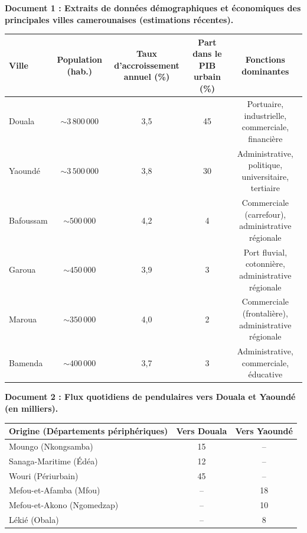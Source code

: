 \documentclass[11pt]{article}
\begin{document}
\begin{exercice}
\textbf{Document 1 : Extraits de données démographiques et économiques des principales villes camerounaises (estimations récentes).}

\begin{tabular}{lcccc}
\toprule
\textbf{Ville} & \textbf{Population (hab.)} & \textbf{Taux d'accroissement annuel (\%)} & \textbf{Part dans le PIB urbain (\%)} & \textbf{Fonctions dominantes} \\
\midrule
Douala & $\sim 3\,800\,000$ & 3,5 & 45 & Portuaire, industrielle, commerciale, financière \\
Yaoundé & $\sim 3\,500\,000$ & 3,8 & 30 & Administrative, politique, universitaire, tertiaire \\
Bafoussam & $\sim 500\,000$ & 4,2 & 4 & Commerciale (carrefour), administrative régionale \\
Garoua & $\sim 450\,000$ & 3,9 & 3 & Port fluvial, cotonnière, administrative régionale \\
Maroua & $\sim 350\,000$ & 4,0 & 2 & Commerciale (frontalière), administrative régionale \\
Bamenda & $\sim 400\,000$ & 3,7 & 3 & Administrative, commerciale, éducative \\
\bottomrule
\end{tabular}

\textbf{Document 2 : Flux quotidiens de pendulaires vers Douala et Yaoundé (en milliers).}
\begin{center}
\begin{tabular}{lcc}
\toprule
\textbf{Origine (Départements périphériques)} & \textbf{Vers Douala} & \textbf{Vers Yaoundé} \\
\midrule
Moungo (Nkongsamba) & 15 & -- \\
Sanaga-Maritime (Édéa) & 12 & -- \\
Wouri (Périurbain) & 45 & -- \\
Mefou-et-Afamba (Mfou) & -- & 18 \\
Mefou-et-Akono (Ngomedzap) & -- & 10 \\
Lékié (Obala) & -- & 8 \\
\bottomrule
\end{tabular}
\end{center}


\end{exercice}
\end{document}

